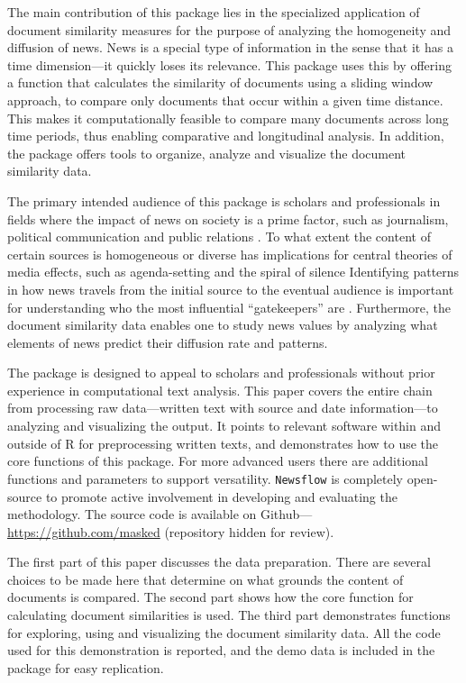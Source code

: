 The main contribution of this package lies in the specialized
application of document similarity measures for the purpose of analyzing
the homogeneity and diffusion of news. News is a special type of
information in the sense that it has a time dimension---it quickly loses
its relevance. This package uses this by offering a function that
calculates the similarity of documents using a sliding window approach,
to compare only documents that occur within a given time distance. This
makes it computationally feasible to compare many documents across long
time periods, thus enabling comparative and longitudinal analysis. In
addition, the package offers tools to organize, analyze and visualize
the document similarity data.

The primary intended audience of this package is scholars and
professionals in fields where the impact of news on society is a prime
factor, such as journalism, political communication and public relations
\citep{baum08, boczkowski07, ragas14}. To what extent the content of
certain sources is homogeneous or diverse has implications for central
theories of media effects, such as agenda-setting and the spiral of
silence \citep{bennett08, blumler99} Identifying patterns in how news
travels from the initial source to the eventual audience is important
for understanding who the most influential ``gatekeepers'' are
\citep{shoemaker09}. Furthermore, the document similarity data enables
one to study news values \citep{galtung65} by analyzing what elements of
news predict their diffusion rate and patterns.

The package is designed to appeal to scholars and professionals without
prior experience in computational text analysis. This paper covers the
entire chain from processing raw data---written text with source and
date information---to analyzing and visualizing the output. It points to
relevant software within and outside of R for preprocessing written
texts, and demonstrates how to use the core functions of this package.
For more advanced users there are additional functions and parameters to
support versatility. \texttt{Newsflow} is completely open-source to
promote active involvement in developing and evaluating the methodology.
The source code is available on Github---\url{https://github.com/masked}
(repository hidden for review).

The first part of this paper discusses the data preparation. There are
several choices to be made here that determine on what grounds the
content of documents is compared. The second part shows how the core
function for calculating document similarities is used. The third part
demonstrates functions for exploring, using and visualizing the document
similarity data. All the code used for this demonstration is reported,
and the demo data is included in the package for easy replication.

